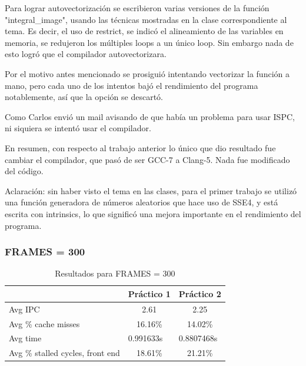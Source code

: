 \documentclass[a4paper,10pt]{article}
\begin{document}
Para lograr autovectorización se escribieron varias versiones de la función "integral\_image",
usando las técnicas mostradas en la clase correspondiente al tema. Es decir, el uso de restrict,
se indicó el alineamiento de las variables en memoria, se redujeron los múltiples loops a un
único loop. Sin embargo nada de esto logró que el compilador autovectorizara.

Por el motivo antes mencionado se prosiguió intentando vectorizar la función a mano, pero cada
uno de los intentos bajó el rendimiento del programa notablemente, así que la opción se descartó.

Como Carlos envió un mail avisando de que había un problema para usar ISPC, ni siquiera se intentó
usar el compilador.

En resumen, con respecto al trabajo anterior lo único que dio resultado fue cambiar el compilador,
que pasó de ser GCC-7 a Clang-5. Nada fue modificado del código.

Aclaración: sin haber visto el tema en las clases, para el primer trabajo se utilizó una función
generadora de números aleatorios que hace uso de SSE4, y está escrita con intrinsics, lo que
significó una mejora importante en el rendimiento del programa. 

\subsubsection*{FRAMES = 300}
\begin{table}[h]
\centering
\label{my-label}
\begin{tabular}{|l|c|c|}
\hline
                                 & \multicolumn{1}{l|}{Práctico 1} & \multicolumn{1}{l|}{Práctico 2} \\ \hline
Avg IPC                          & 2.61                            & 2.25                            \\ \hline
Avg \% cache misses              & 16.16\%                         & 14.02\%                         \\ \hline
Avg time                         & \multicolumn{1}{l|}{0.991633s}  & \multicolumn{1}{l|}{0.8807468s} \\ \hline
Avg \% stalled cycles, front end & 18.61\%                         & 21.21\%                         \\ \hline
\end{tabular}
\caption{Resultados para FRAMES = 300}
\end{table}
\end{document}
